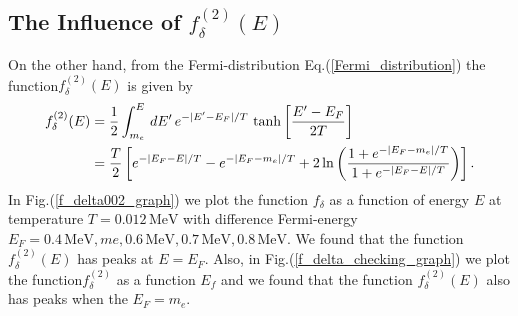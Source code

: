 \documentclass[onecolumn,preprintnumbers,amsmath,amssymb]{revtex4}
\begin{document}
\subsection{The Influence of $f^{(2)}_\delta(E)$}
On the other hand, from the Fermi-distribution Eq.(\ref{Fermi_distribution}) the function$f^{(2)}_\delta(E)$ is given by
\begin{align}
f^{(2)}_\delta(E)&=\frac{1}{2}\int^{E}_{m_e}\,dE^\prime\,e^{-|E^\prime-E_F|/T}\,\tanh\bigg[\frac{E^\prime-E_F}{2T}\bigg]\notag\\
&=\frac{T}{2}\left[e^{-|E_F-E|/T}-e^{-|E_F-m_e|/T}+2\ln{\left(\frac{1+e^{-|E_F-m_e|/T}}{1+e^{-|E_F-E|/T}}\right)}\right].
\end{align}
In Fig.(\ref{f_delta002_graph}) we plot the function $f_\delta$ as a function of energy $E$ at temperature $T=0.012\,\mathrm{MeV}$ with difference Fermi-energy $E_F=0.4\,\mathrm{MeV},me, 0.6\,\mathrm{MeV}, 0.7\,\mathrm{MeV},0.8\,\mathrm{MeV}$. We found that the function $f^{(2)}_\delta(E)$ has peaks at $E=E_F$.  Also, in Fig.(\ref{f_delta_checking_graph}) we plot the function$f^{(2)}_\delta$ as a function $E_f$ and we found that the function $f^{(2)}_\delta(E)$ also has peaks when the $E_F=m_e$.
\end{document}
